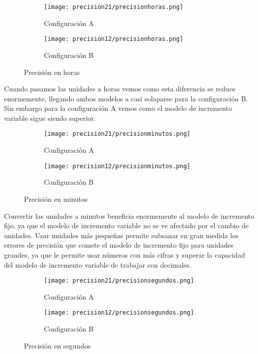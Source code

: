 \begin{figure}[H]
	\centering
	\begin{subfigure}[b]{0.8\textwidth}
		\centering
		\texttt{[image: precision21/precisionhoras.png]}
		\caption{Configuración A}
	\end{subfigure}
	\hfill
	\begin{subfigure}[b]{0.8\textwidth}
		\centering
		\texttt{[image: precision12/precisionhoras.png]}
		\caption{Configuración B}
	\end{subfigure}
	\caption{Precisión en horas}
\end{figure}

Cuando pasamos las unidades a horas vemos como esta diferencia se reduce enormemente, llegando ambos modelos a casi solaparse para la configuración B. Sin embargo para la configuración A vemos como el modelo de incremento variable sigue siendo superior.

\begin{figure}[H]
	\centering
	\begin{subfigure}[b]{0.8\textwidth}
		\centering
		\texttt{[image: precision21/precisionminutos.png]}
		\caption{Configuración A}
	\end{subfigure}
	\hfill
	\begin{subfigure}[b]{0.8\textwidth}
		\centering
		\texttt{[image: precision12/precisionminutos.png]}
		\caption{Configuración B}
	\end{subfigure}
	\caption{Precisión en minutos}
\end{figure}

Convertir las unidades a minutos beneficia enormemente al modelo de incremento fijo, ya que el modelo de incremento variable no se ve afectado por el cambio de unidades. Usar unidades más pequeñas permite subsanar en gran medida los errores de precisión que comete el modelo de incremento fijo para unidades grandes, ya que le permite usar números con más cifras y superar la capacidad del modelo de incremento variable de trabajar con decimales.

\begin{figure}[H]
	\centering
	\begin{subfigure}[b]{0.8\textwidth}
		\centering
		\texttt{[image: precision21/precisionsegundos.png]}
		\caption{Configuración A}
	\end{subfigure}
	\hfill
	\begin{subfigure}[b]{0.8\textwidth}
		\centering
		\texttt{[image: precision12/precisionsegundos.png]}
		\caption{Configuración B}
	\end{subfigure}
	\caption{Precisión en segundos}
\end{figure}

